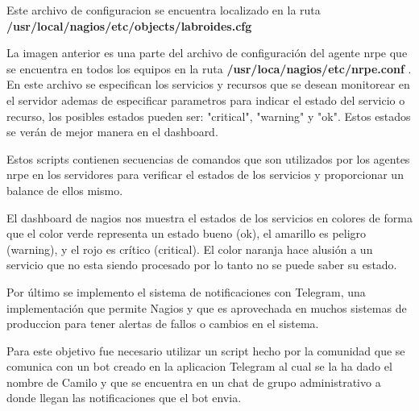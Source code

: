    
   Este archivo de configuracion  se encuentra localizado en la ruta \textbf{/usr/local/nagios/etc/objects/labroides.cfg}
   
   
    
   
   
   
   La imagen anterior es una parte del archivo de configuración del agente nrpe que se encuentra en todos los equipos en la ruta \textbf{/usr/loca/nagios/etc/nrpe.conf} . En este archivo se especifican los servicios y recursos que se desean monitorear en el servidor ademas de especificar parametros para indicar el estado del servicio o recurso, los posibles estados pueden ser: "critical", "warning" y "ok". Estos estados se verán de mejor manera en el dashboard.
   
   
   Estos scripts contienen secuencias de comandos que son utilizados por los agentes nrpe en los servidores para verificar el estados de los servicios y proporcionar un balance de ellos mismo.
   
   
   
    
    
    El dashboard de nagios nos muestra el estados de los servicios en colores de forma que el color verde representa  un estado bueno (ok), el amarillo es peligro (warning), y el rojo es crítico (critical). El color naranja hace alusión a un servicio que no esta siendo procesado por lo tanto no se puede saber su estado.
    
    
    Por último se implemento el sistema de notificaciones con Telegram, una implementación que permite Nagios y que es aprovechada en muchos sistemas de produccion para tener alertas de fallos o cambios en el sistema.
    
    Para este objetivo fue necesario utilizar un script hecho por la comunidad  que se comunica con un bot creado en la aplicacion Telegram al cual se la ha dado el nombre de Camilo y que se encuentra en un chat de grupo administrativo a donde llegan las notificaciones que el bot envia.
    
